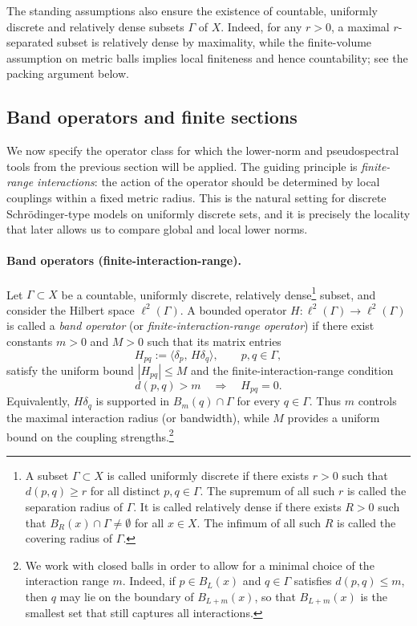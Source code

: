 \documentclass[11pt]{article}
\theoremstyle{definition}
\begin{document}
\medskip

The standing assumptions also ensure the existence of countable, uniformly discrete and relatively dense subsets $\Gamma$ of $X$. Indeed, for any $r>0$, a maximal $r$-separated subset is relatively dense by maximality, while the finite-volume assumption on metric balls implies local finiteness and hence countability; see the packing argument below.

\subsection{Band operators and finite sections}
\label{sec:band-and-windows}

We now specify the operator class for which the lower-norm and pseudospectral
tools from the previous section will be applied.  The guiding principle is
\emph{finite-range interactions}: the action of the operator should be
determined by local couplings within a fixed metric radius.  This is the
natural setting for discrete Schr\"odinger-type models on uniformly discrete
sets, and it is precisely the locality that later allows us to compare global
and local lower norms.

\paragraph{Band operators (finite-interaction-range).}
Let $\Gamma\subset X$ be a countable, uniformly discrete, relatively dense\footnote{A subset $\Gamma\subset X$ is called uniformly discrete if there exists $r>0$ such that $d(p,q)\ge r$ for all distinct $p,q\in\Gamma$. The supremum of all such $r$ is called the separation radius of $\Gamma$. It is called relatively dense if there exists $R>0$ such that $B_R(x)\cap\Gamma\neq\emptyset$ for all $x\in X$. The infimum of all such $R$ is called the covering radius of $\Gamma$.} subset, and consider the
Hilbert space $\ell^2(\Gamma)$. A bounded operator
$H:\ell^2(\Gamma)\to \ell^2(\Gamma)$ is called a \emph{band operator} (or
\emph{finite-interaction-range operator}) if there exist constants $m>0$ and $M>0$ such that
its matrix entries
\[
  H_{pq} := \langle \delta_p,\,H\delta_q\rangle, \qquad p,q\in\Gamma,
\]
satisfy the uniform bound $|H_{pq}|\le M$ and the finite-interaction-range condition
\[
  d(p,q) > m \quad \Longrightarrow \quad H_{pq}=0.
\]
Equivalently, $H\delta_q$ is supported in $B_m(q)\cap\Gamma$ for every $q\in\Gamma$.
Thus $m$ controls the maximal interaction radius (or bandwidth), while $M$ provides a uniform
bound on the coupling strengths.\footnote{We work with closed balls in order to allow for a minimal choice of the interaction range $m$. Indeed, if $p\in B_L(x)$ and $q\in\Gamma$ satisfies $d(p,q)\le m$, then $q$ may lie on the boundary of $B_{L+m}(x)$, so that $B_{L+m}(x)$ is the smallest set that still captures all interactions.}
\end{document}

